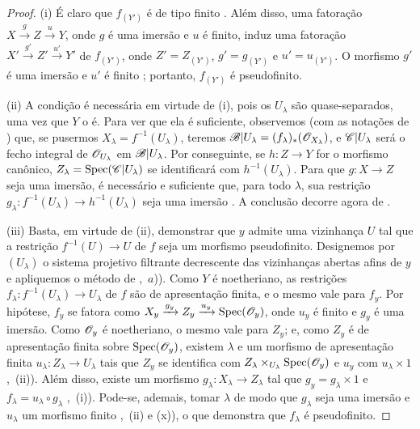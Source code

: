 \begin{proof}
(i) É claro que $f_{(Y')}$ é de tipo finito . Além disso, uma fatoração $X\xrightarrow{g}Z\xrightarrow{u}Y$, onde $g$ é uma imersão e $u$ é finito, induz uma fatoração $X'\xrightarrow{g'}Z'\xrightarrow{u'}Y'$ de $f_{(Y')}$, onde $Z'=Z_{(Y')}$, $g'=g_{(Y')}$ e $u'=u_{(Y')}$. O morfismo $g'$ é uma imersão  e $u'$ é finito ; portanto, $f_{(Y')}$ é pseudofinito.

(ii) A condição é necessária em virtude de (i), pois os $U_\lambda$ são quase-separados, uma vez que $Y$ o é.
Para ver que ela é suficiente, observemos (com as notações de ) que, se pusermos $X_\lambda=f^{-1}(U_\lambda)$, teremos $\mathscr{B}|U_\lambda=(f_\lambda)_*(\mathscr{O}_{X_\lambda})$, e $\mathscr{C}|U_\lambda$ será o fecho integral de $\mathscr{O}_{U_\lambda}$ em $\mathscr{B}|U_\lambda$. Por conseguinte, se $h:Z\to Y$ for o morfismo canônico, $Z_\lambda=\operatorname{Spec}(\mathscr{C}|U_\lambda)$ se identificará com $h^{-1}(U_\lambda)$. Para que $g:X\to Z$ seja uma imersão, é necessário e suficiente que, para todo $\lambda$, sua restrição $g_\lambda:f^{-1}(U_\lambda)\to h^{-1}(U_\lambda)$ seja uma imersão . A conclusão decorre agora de .

(iii) Basta, em virtude de (ii), demonstrar que $y$ admite uma vizinhança $U$ tal que a restrição $f^{-1}(U)\to U$ de $f$ seja um morfismo pseudofinito.
Designemos por $(U_\lambda)$ o sistema projetivo filtrante decrescente das vizinhanças abertas afins de $y$ e apliquemos o método de ,~$a$)).
Como $Y$ é noetheriano, as restrições $f_\lambda:f^{-1}(U_\lambda)\to U_\lambda$ de $f$ são de apresentação finita, e o mesmo vale para $f_y$.
Por hipótese, $f_y$ se fatora como $X_y\xrightarrow{g_y}Z_y\xrightarrow{u_y}\operatorname{Spec}(\mathscr{O}_y)$, onde $u_y$ é finito e $g_y$ é uma imersão.
Como $\mathscr{O}_y$ é noetheriano, o mesmo vale para $Z_y$; e, como $Z_y$ é de apresentação finita sobre $\operatorname{Spec}(\mathscr{O}_y)$, existem $\lambda$ e um morfismo de apresentação finita $u_\lambda:Z_\lambda\to U_\lambda$ tais que $Z_y$ se identifica com $Z_\lambda\times_{U_\lambda}\operatorname{Spec}(\mathscr{O}_y)$ e $u_y$ com $u_\lambda\times 1$ ,~(ii)). Além disso, existe um morfismo $g_\lambda:X_\lambda\to Z_\lambda$ tal que $g_y=g_\lambda\times 1$ e $f_\lambda=u_\lambda\circ g_\lambda$ ,~(i)). Pode-se, ademais, tomar $\lambda$ de modo que $g_\lambda$ seja uma imersão e $u_\lambda$ um morfismo finito ,~(ii) e (x)), o que demonstra que $f_\lambda$ é pseudofinito.
\end{proof}

